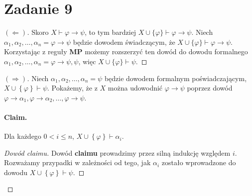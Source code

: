 \section*{Zadanie 9}

\begin{proof}[\( (\Leftarrow) \)]
    Skoro \( X \vdash \varphi \to \psi \), to tym bardziej \( X \cup \{\varphi\} \vdash \varphi \to \psi \). Niech \( \alpha_1, \alpha_2, \ldots, \alpha_n = \varphi \to \psi \) będzie dowodem świadczącym, że \( X \cup \{ \varphi \} \vdash \varphi \to \psi \). Korzystając z reguły \textbf{MP} możemy rozszerzyć ten dowód do dowodu formalnego \( \alpha_1, \alpha_2, \ldots, \alpha_n = \varphi \to \psi, \psi \), więc \( X \cup \{\varphi\} \vdash \psi \).
\end{proof}

\begin{proof}[\( (\Rightarrow) \)]
    Niech \( \alpha_1, \alpha_2, \ldots, \alpha_n = \psi \) będzie dowodem formalnym poświadczającym, \( X \cup \left\{ \varphi \right\} \vdash \psi \). Pokażemy, że z \( X \) można udowodnić \( \varphi \to \psi \) poprzez dowód \( \varphi \to \alpha_1, \varphi \to \alpha_2, \ldots, \varphi \to \psi \).

    \paragraph{Claim.} Dla każdego \( 0 < i \leqslant n \), \( X \cup \left\{ \varphi \right\} \vdash \alpha_i \).

\begin{proof}[Dowód claimu]
    Dowód \textbf{claimu} prowadzimy przez silną indukcję względem \( i \). Rozważamy przypadki w zależności od tego, jak \( \alpha_i \) zostało wprowadzone do dowodu \( X \cup \left\{ \varphi \right\} \vdash \psi\).


\end{proof}
\end{proof}
